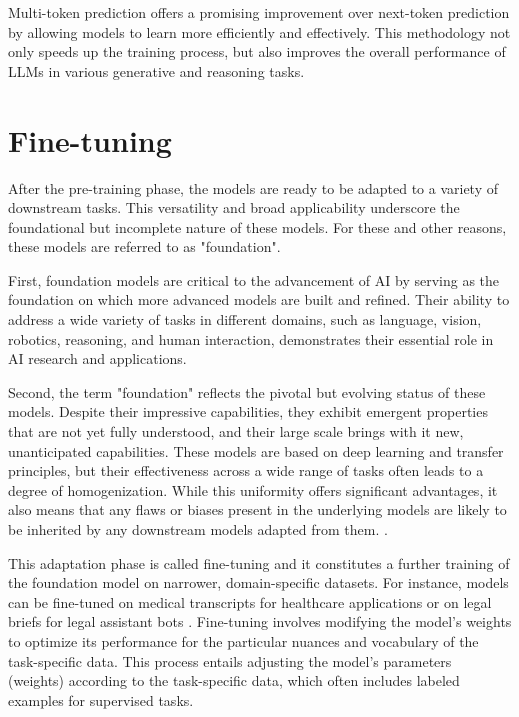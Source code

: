 Multi-token prediction offers a promising improvement over next-token prediction by allowing models to learn more efficiently and effectively. This methodology not only speeds up the training process, but also improves the overall performance of LLMs in various generative and reasoning tasks.

\section{Fine-tuning}

After the pre-training phase, the models are ready to be adapted to a variety of downstream tasks. This versatility and broad applicability underscore the foundational but incomplete nature of these models. For these and other reasons, these models are referred to as "foundation".

First, foundation models are critical to the advancement of AI by serving as the foundation on which more advanced models are built and refined. Their ability to address a wide variety of tasks in different domains, such as language, vision, robotics, reasoning, and human interaction, demonstrates their essential role in AI research and applications.

Second, the term "foundation" reflects the pivotal but evolving status of these models. Despite their impressive capabilities, they exhibit emergent properties that are not yet fully understood, and their large scale brings with it new, unanticipated capabilities. These models are based on deep learning and transfer principles, but their effectiveness across a wide range of tasks often leads to a degree of homogenization. While this uniformity offers significant advantages, it also means that any flaws or biases present in the underlying models are likely to be inherited by any downstream models adapted from them. \cite{bommasani2021opportunities}.

This adaptation phase is called fine-tuning and it constitutes a further training of the foundation model on narrower, domain-specific datasets. For instance, models can be fine-tuned on medical transcripts for healthcare applications or on legal briefs for legal assistant bots \cite{radford2019language}. Fine-tuning involves modifying the model’s weights to optimize its performance for the particular nuances and vocabulary of the task-specific data. This process entails adjusting the model's parameters (weights) according to the task-specific data, which often includes labeled examples for supervised tasks.

